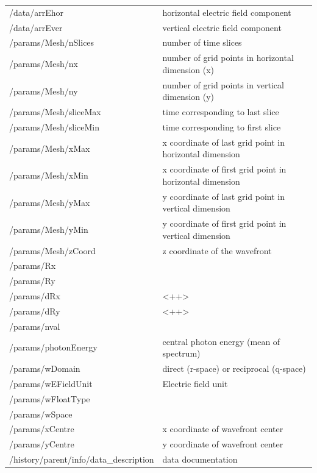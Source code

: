 \documentclass[12pt]{scrartcl}
\begin{document}
    {%
      \scriptsize
    \begin{tabular}{l|l}
      \hline
      \hline
      /data/arrEhor     & horizontal electric field component \\
      /data/arrEver     & vertical electric field component \\
      /params/Mesh/nSlices    & number of time slices \\
      /params/Mesh/nx     & number of grid points in horizontal dimension (x) \\
      /params/Mesh/ny     & number of grid points in vertical dimension (y) \\
      /params/Mesh/sliceMax     & time corresponding to last slice \\
      /params/Mesh/sliceMin     & time corresponding to first slice \\
      /params/Mesh/xMax     & x coordinate of last grid point in horizontal dimension \\
      /params/Mesh/xMin     & x coordinate of first grid point in horizontal dimension \\
      /params/Mesh/yMax     & y coordinate of last grid point in vertical dimension \\
      /params/Mesh/yMin     & y coordinate of first grid point in vertical dimension \\
      /params/Mesh/zCoord     & z coordinate of the wavefront \\
      /params/Rx    &  \\
      /params/Ry    &  \\
      /params/dRx     & <++> \\
      /params/dRy     & <++> \\
      /params/nval    &  \\
      /params/photonEnergy    & central photon energy (mean of spectrum) \\
      /params/wDomain     & direct (r-space) or reciprocal (q-space)\\
      /params/wEFieldUnit     & Electric field unit \\
      /params/wFloatType    &  \\
      /params/wSpace    &  \\
      /params/xCentre     & x coordinate of wavefront center \\
      /params/yCentre     & y coordinate of wavefront center \\
      /history/parent/info/data\_description     & data documentation \\

\end{tabular}}
\end{document}

